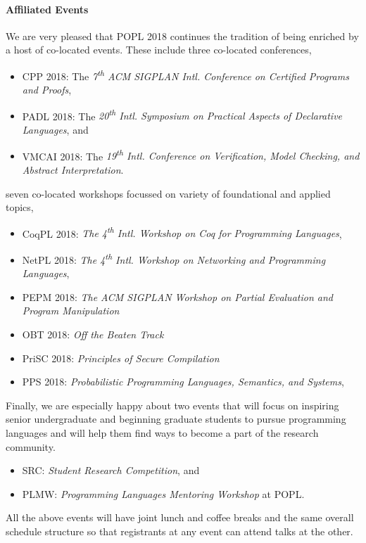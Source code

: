 \documentclass[11pt]{article}
\begin{document}
\paragraph{Affiliated Events}
%
We are very pleased that POPL 2018 continues the tradition of being enriched
by a host of co-located events.
%
These include three co-located conferences,
%
\begin{itemize}
  \item CPP 2018:   The \emph{7\textsuperscript{th} ACM SIGPLAN Intl. Conference on Certified Programs and Proofs},
  \item PADL 2018:  The \emph{20\textsuperscript{th} Intl. Symposium on Practical Aspects of Declarative Languages}, and
  \item VMCAI 2018: The \emph{19\textsuperscript{th} Intl. Conference on Verification, Model Checking, and Abstract Interpretation}.
\end{itemize}
%
seven co-located workshops focussed on variety of foundational and applied topics,
%
\begin{itemize}
  \item CoqPL 2018: \emph{The 4\textsuperscript{th} Intl. Workshop on Coq for Programming Languages},
  \item NetPL 2018: \emph{The 4\textsuperscript{th} Intl. Workshop on Networking and Programming Languages},
  \item PEPM 2018:  \emph{The ACM SIGPLAN Workshop on Partial Evaluation and Program Manipulation}
  \item OBT 2018:   \emph{Off the Beaten Track}
  \item PriSC 2018: \emph{Principles of Secure Compilation}
  \item PPS 2018:   \emph{Probabilistic Programming Languages, Semantics, and Systems},
\end{itemize}
%
Finally, we are especially happy about two events that
will focus on inspiring senior undergraduate and beginning
graduate students to pursue programming languages and
will help them find ways to become a part of the research
community.
%
\begin{itemize}
\item SRC: \emph{Student Research Competition}, and
\item PLMW: \emph{Programming Languages Mentoring Workshop} at POPL.
\end{itemize}
%
All the above events will have joint lunch and coffee breaks
and the same overall schedule structure so that registrants
at any event can attend talks at the other.
\end{document}
